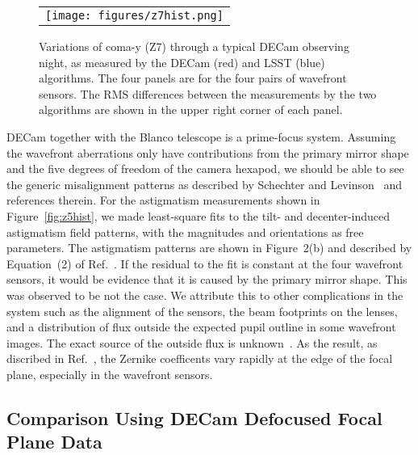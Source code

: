 \documentclass[]{spie}  %
\begin{document}
   \begin{figure} [tbph]
   \begin{center}
   \begin{tabular}{c} %
   \texttt{[image: figures/z7hist.png]}
   \end{tabular}
   \end{center}
   \caption[example] 
   { \label{fig:z7hist} 
Variations of coma-y (Z7) through a typical DECam observing night, as measured by the DECam (red) and LSST (blue) algorithms. The four panels are for the four pairs of wavefront sensors.
The RMS differences between the measurements by the two algorithms are shown in the upper right corner of each panel. 
}
   \end{figure} 

DECam together with the Blanco telescope is a prime-focus system.
Assuming the wavefront aberrations only have contributions from the primary mirror shape and the 
five degrees of freedom of the camera hexapod, we should be able to see the 
generic misalignment patterns as described by Schechter and Levinson~\cite{SchechterPASP} 
and references therein.
For the astigmatism measurements shown in Figure~\ref{fig:z5hist}, we made least-square fits to
the tilt- and decenter-induced astigmatism field patterns, with the magnitudes and orientations as free parameters. The astigmatism patterns are shown in Figure~2(b) and described by Equation~(2) of Ref.~.
If the residual to the fit is constant at the four wavefront sensors, it would be evidence that it is caused by
the primary mirror shape. This was observed to be not the case.
We attribute this to other complications in the system such as the alignment of the sensors, the beam footprints on the lenses, and a distribution of flux outside the expected pupil outline in some wavefront images.
The exact source of the outside flux is unknown~\cite{roodman14}.
As the result, as discribed in Ref.~, the Zernike coefficents vary rapidly at the edge of the focal plane, especially in the wavefront 
sensors.

\subsection{Comparison Using DECam Defocused Focal Plane Data}
\end{document}
